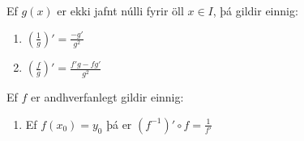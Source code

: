 \documentclass[a4paper,10pt,icelandic]{sphinxmanual}
\begin{document}
Ef \(g(x)\) er ekki jafnt núlli fyrir öll \(x\in I\), þá gildir einnig:
\begin{enumerate}
%
\setcounter{enumi}{5}
\item {} 
\(\left(\frac{1}{g}\right)'=\frac{-g'}{g^2}\)

\item {} 
\(\left(\frac{f}{g}\right)'=\frac{f'g-fg'}{g^2}\)

\end{enumerate}

Ef \(f\) er andhverfanlegt gildir einnig:
\begin{enumerate}
%
\setcounter{enumi}{7}
\item {} 
Ef \(f(x_0)=y_0\) þá er \((f^{-1})'\circ f=\frac{1}{f'}\)

\end{enumerate}
\end{document}
